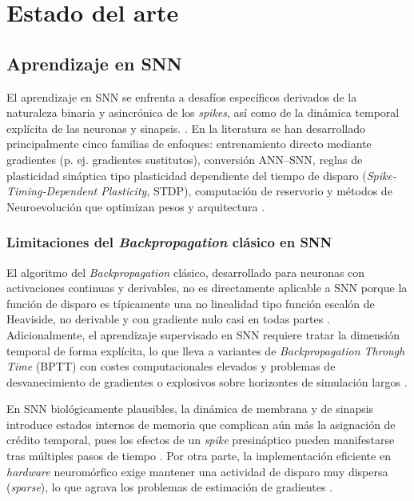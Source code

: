 \chapter{Estado del arte}

\section{Aprendizaje en SNN}

El aprendizaje en SNN se enfrenta a desafíos específicos derivados de la naturaleza binaria y asincrónica de los \textit{spikes}, así como de la dinámica temporal explícita de las neuronas y sinapsis. \cite{Neftci2019SurrogateGradient, Zenke2021surrogatesnn}. En la literatura se han desarrollado principalmente cinco familias de enfoques: entrenamiento directo mediante gradientes (p. ej. gradientes sustitutos), conversión ANN–SNN, reglas de plasticidad sináptica tipo plasticidad dependiente del tiempo de disparo (\textit{Spike-Timing-Dependent Plasticity}, STDP), computación de reservorio y métodos de Neuroevolución que optimizan pesos y arquitectura \cite{Bittar2022surrogatespiking, Moisy2006snnsurvey}.

\subsection{Limitaciones del \textit{Backpropagation} clásico en SNN}
El algoritmo del \textit{Backpropagation} clásico, desarrollado para neuronas con activaciones continuas y derivables, no es directamente aplicable a SNN porque la función de disparo es típicamente una no linealidad tipo función escalón de Heaviside, no derivable y con gradiente nulo casi en todas partes \cite{Zenke2021surrogatesnn}. Adicionalmente, el aprendizaje supervisado en SNN requiere tratar la dimensión temporal de forma explícita, lo que lleva a variantes de \textit{Backpropagation Through Time} (BPTT) con costes computacionales elevados y problemas de desvanecimiento de gradientes o explosivos sobre horizontes de simulación largos \cite{Neftci2019SurrogateGradient, Bittar2022surrogatespiking}.

En SNN biológicamente plausibles, la dinámica de membrana y de sinapsis introduce estados internos de memoria que complican aún más la asignación de crédito temporal, pues los efectos de un \textit{spike} presináptico pueden manifestarse tras múltiples pasos de tiempo \cite{Moisy2006snnsurvey}. Por otra parte, la implementación eficiente en \textit{hardware} neuromórfico exige mantener una actividad de disparo muy dispersa (\textit{sparse}), lo que agrava los problemas de estimación de gradientes \cite{Li2024snnsparsesurrogate, Schuman2022Opportunities}.

